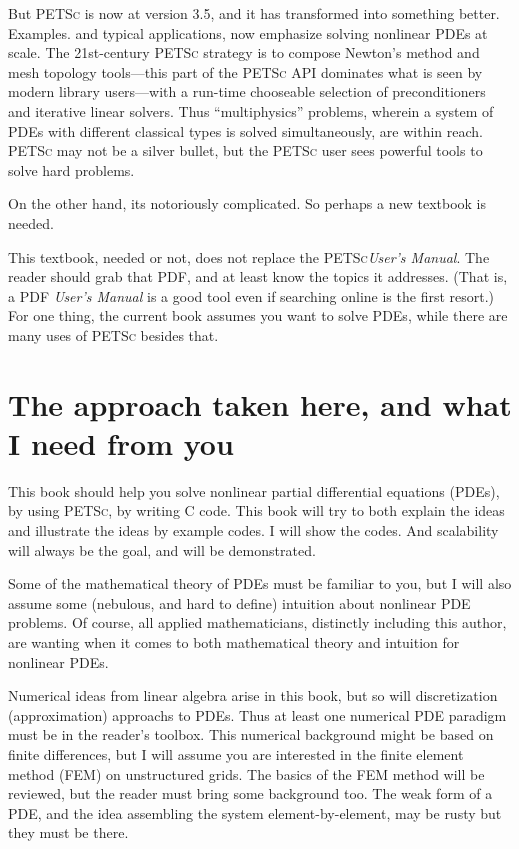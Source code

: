 \documentclass{tufte-book}
\newcommand{\PETSc}{\textsc{PETSc}\xspace}
\begin{document}
But \PETSc is now at version 3.5, and it has transformed into something better.  Examples. and typical applications, now emphasize solving nonlinear PDEs at scale.  The 21st-century \PETSc strategy is to compose Newton's method and mesh topology tools---this part of the \PETSc API dominates what is seen by modern library users---with a run-time chooseable selection of preconditioners and iterative linear solvers.  Thus ``multiphysics'' problems, wherein a system of PDEs with different classical types is solved simultaneously, are within reach.  \PETSc may not be a silver bullet, but the \PETSc user sees powerful tools to solve hard problems.

On the other hand, its notoriously complicated.  So perhaps a new textbook is needed.

This textbook, needed or not, does not replace the \PETSc \emph{User's Manual}.  The reader should grab that PDF, and at least know the topics it addresses.  (That is, a PDF \emph{User's Manual} is a good tool even if searching online is the first resort.)  For one thing, the current book assumes you want to solve PDEs, while there are many uses of \PETSc besides that.

\section{The approach taken here, and what I need from you}  This book should help you solve nonlinear partial differential equations (PDEs), by using \PETSc, by writing C code.  This book will try to both explain the ideas and illustrate the ideas by example codes.  I will show the codes.  And scalability will always be the goal, and will be demonstrated.

Some of the mathematical theory of PDEs must be familiar to you, but I will also assume some (nebulous, and hard to define) intuition about nonlinear PDE problems.  Of course, all applied mathematicians, distinctly including this author, are wanting  when it comes to both mathematical theory and intuition for nonlinear PDEs.

Numerical ideas from linear algebra \citep{TrefethenBau} arise in this book, but so will discretization (approximation) approachs to PDEs.  Thus at least one numerical PDE paradigm must be in the reader's toolbox.  This numerical background might be based on finite differences, but I will assume you are interested in the finite element method (FEM) on unstructured grids.  The basics of the FEM method will be reviewed, but the reader must bring some background too.  The weak form of a PDE, and the idea assembling the system element-by-element, may be rusty but they must be there.
\end{document}
